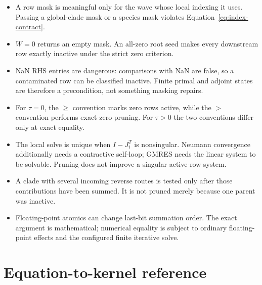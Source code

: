 \documentclass[11pt]{article}
\begin{document}
\begin{itemize}
  \item A row mask is meaningful only for the wave whose local indexing it
        uses.  Passing a global-clade mask or a species mask violates
        Equation~\eqref{eq:index-contract}.
  \item $W=0$ returns an empty mask.  An all-zero root seed makes every
        downstream row exactly inactive under the strict zero criterion.
  \item NaN RHS entries are dangerous: comparisons with NaN are false, so a
        contaminated row can be classified inactive.  Finite primal and
        adjoint states are therefore a precondition, not something masking
        repairs.
  \item For $\tau=0$, the $\ge$ convention marks zero rows active, while the
        $>$ convention performs exact-zero pruning.  For $\tau>0$ the two
        conventions differ only at exact equality.
  \item The local solve is unique when $I-J_i^T$ is nonsingular.  Neumann
        convergence additionally needs a contractive self-loop; GMRES needs
        the linear system to be solvable.  Pruning does not improve a singular
        active-row system.
  \item A clade with several incoming reverse routes is tested only after
        those contributions have been summed.  It is not pruned merely
        because one parent was inactive.
  \item Floating-point atomics can change last-bit summation order.  The exact
        argument is mathematical; numerical equality is subject to ordinary
        floating-point effects and the configured finite iterative solve.
\end{itemize}

\section{Equation-to-kernel reference}
\end{document}
